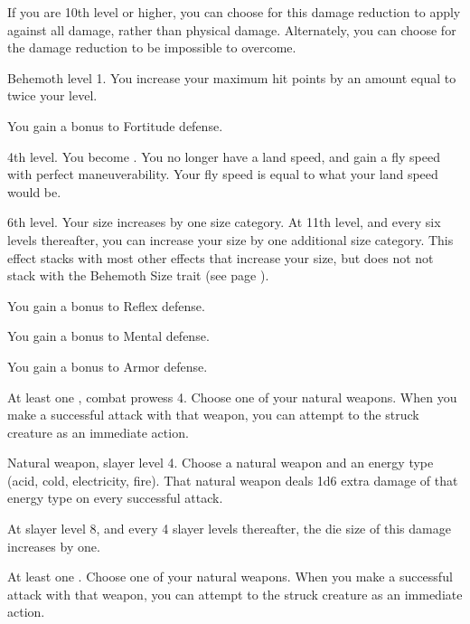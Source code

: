     If you are 10th level or higher, you can choose for this damage reduction to apply against all damage, rather than physical damage.
    Alternately, you can choose for the damage reduction to be impossible to overcome.

    \featpre Behemoth level 1.
    \featben You increase your maximum hit points by an amount equal to twice your level.

    \featben You gain a  bonus to Fortitude defense.

    \featpre 4th level.
    \featben You become .
    You no longer have a land speed, and gain a fly speed with perfect maneuverability.
    Your fly speed is equal to what your land speed would be.

    \featpre 6th level.
    \featben Your size increases by one size category.
    At 11th level, and every six levels thereafter, you can increase your size by one additional size category.
    This effect stacks with most other effects that increase your size, but does not not stack with the Behemoth Size trait (see page ).

    \featben You gain a  bonus to Reflex defense.

    \featben You gain a  bonus to Mental defense.

    \featben You gain a  bonus to Armor defense.

    \featpre At least one , combat prowess 4.
    \featben Choose one of your natural weapons.
    When you make a successful attack with that weapon, you can attempt to  the struck creature as an immediate action.

    \featpre Natural weapon, slayer level 4.
    \featben Choose a natural weapon and an energy type (acid, cold, electricity, fire).
    That natural weapon deals 1d6 extra damage of that energy type on every successful attack.

    At slayer level 8, and every 4 slayer levels thereafter, the die size of this damage increases by one.

    \featpre At least one .
    \featben Choose one of your natural weapons.
    When you make a successful attack with that weapon, you can attempt to  the struck creature as an immediate action.

